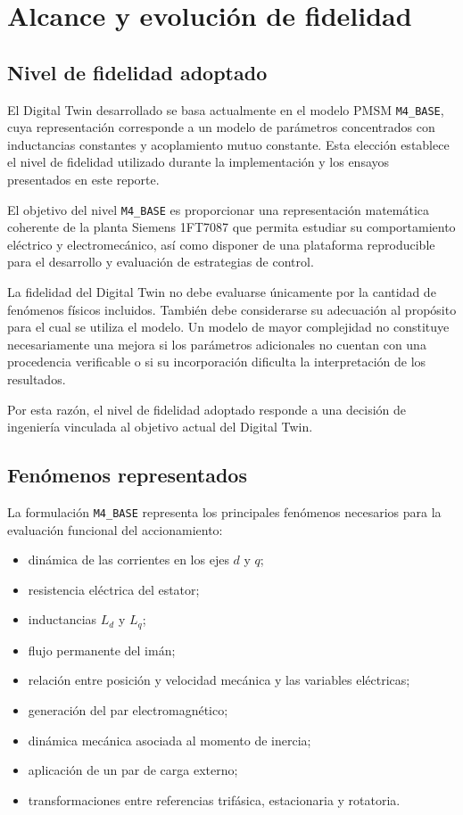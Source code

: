 \section{Alcance y evolución de fidelidad}

\subsection{Nivel de fidelidad adoptado}

El Digital Twin desarrollado se basa actualmente en el modelo PMSM \texttt{M4\_BASE}, cuya representación corresponde a un modelo de parámetros concentrados con inductancias constantes y acoplamiento mutuo constante. Esta elección establece el nivel de fidelidad utilizado durante la implementación y los ensayos presentados en este reporte.

El objetivo del nivel \texttt{M4\_BASE} es proporcionar una representación matemática coherente de la planta Siemens 1FT7087 que permita estudiar su comportamiento eléctrico y electromecánico, así como disponer de una plataforma reproducible para el desarrollo y evaluación de estrategias de control.

La fidelidad del Digital Twin no debe evaluarse únicamente por la cantidad de fenómenos físicos incluidos. También debe considerarse su adecuación al propósito para el cual se utiliza el modelo. Un modelo de mayor complejidad no constituye necesariamente una mejora si los parámetros adicionales no cuentan con una procedencia verificable o si su incorporación dificulta la interpretación de los resultados.

Por esta razón, el nivel de fidelidad adoptado responde a una decisión de ingeniería vinculada al objetivo actual del Digital Twin.

\subsection{Fenómenos representados}

La formulación \texttt{M4\_BASE} representa los principales fenómenos necesarios para la evaluación funcional del accionamiento:

\begin{itemize}
\item dinámica de las corrientes en los ejes $d$ y $q$;
\item resistencia eléctrica del estator;
\item inductancias $L_d$ y $L_q$;
\item flujo permanente del imán;
\item relación entre posición y velocidad mecánica y las variables eléctricas;
\item generación del par electromagnético;
\item dinámica mecánica asociada al momento de inercia;
\item aplicación de un par de carga externo;
\item transformaciones entre referencias trifásica, estacionaria y rotatoria.
\end{itemize}

